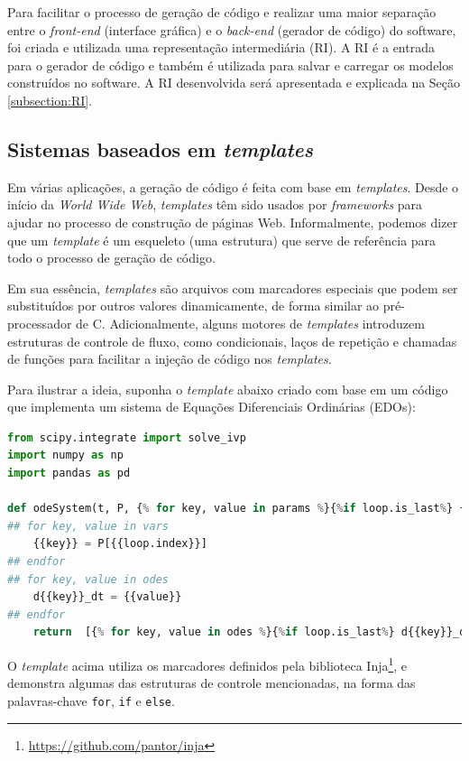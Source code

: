\documentclass[
	12pt,				%
	openright,			%
	oneside,			%
	a4paper,			%
	main=brazil,
	english,			%
	]{ufsj-abntex2}
\begin{document}
Para facilitar o processo de geração de código e realizar uma maior separação entre o \textit{front-end} (interface gráfica) e o \textit{back-end} (gerador de código) do software, foi criada e utilizada uma representação intermediária (RI). A RI é a entrada para o gerador de código e também é utilizada para salvar e carregar os modelos construídos no software. A RI desenvolvida será apresentada e explicada na Seção \ref{subsection:RI}.

\subsection{Sistemas baseados em \textit{templates}}
 
Em várias aplicações, a geração de código é feita com base em \textit{templates}. Desde o início da \textit{World Wide Web}, \textit{templates} têm sido usados por \textit{frameworks} para ajudar no processo de construção de páginas Web. Informalmente, podemos dizer que um \textit{template} é um esqueleto (uma estrutura) que serve de referência para todo o processo de geração de código.

Em sua essência, \textit{templates} são arquivos com marcadores especiais que podem ser substituídos por outros valores dinamicamente, de forma similar ao pré-processador de C. Adicionalmente, alguns motores de \textit{templates} introduzem estruturas de controle de fluxo, como condicionais, laços de repetição e chamadas de funções para facilitar a injeção de código nos \textit{templates}.  

Para ilustrar a ideia, suponha o \textit{template} abaixo criado com base em um código que implementa um sistema de Equações Diferenciais Ordinárias (EDOs):  

\begin{lstlisting}[language=Python, firstnumber=1]
from scipy.integrate import solve_ivp
import numpy as np
import pandas as pd

def odeSystem(t, P, {% for key, value in params %}{%if loop.is_last%} {{key}} {%else%} {{key}}, {%endif%}{%endfor%}):
## for key, value in vars
    {{key}} = P[{{loop.index}}]
## endfor
## for key, value in odes
    d{{key}}_dt = {{value}}
## endfor     
    return  [{% for key, value in odes %}{%if loop.is_last%} d{{key}}_dt {%else%} d{{key}}_dt, {%endif%}{%endfor%}]
\end{lstlisting}

O \textit{template} acima utiliza os marcadores definidos pela biblioteca Inja\footnote{\href{https://github.com/pantor/inja}{https://github.com/pantor/inja}}, e demonstra algumas das estruturas de controle mencionadas, na forma das palavras-chave \texttt{\textcolor{codepurple}{for}}, \texttt{\textcolor{codepurple}{if}} e \texttt{\textcolor{codepurple}{else}}.
\end{document}
